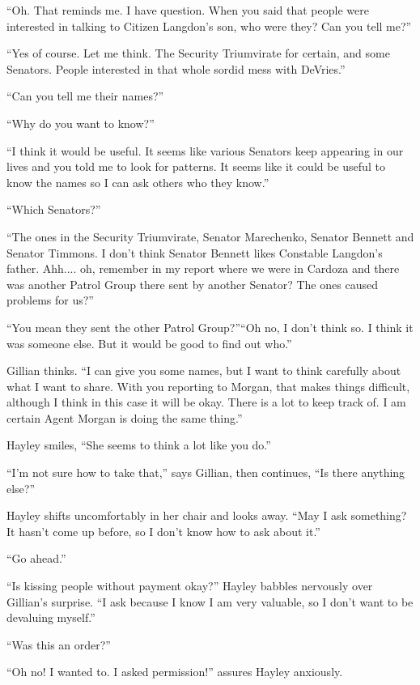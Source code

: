 ``Oh.  That reminds me.  I have question.  When you said that people were interested in talking to Citizen Langdon's son, who were they?  Can you tell me?''

``Yes of course.  Let me think.  The Security Triumvirate for certain, and some Senators.  People interested in that whole sordid mess with DeVries.''

``Can you tell me their names?''

``Why do you want to know?''

``I think it would be useful.  It seems like various Senators keep appearing in our lives and you told me to look for patterns.  It seems like it could be useful to know the names so I can ask others who they know.''

``Which Senators?''

``The ones in the Security Triumvirate, Senator Marechenko, Senator Bennett and Senator Timmons.  I don't think Senator Bennett likes Constable Langdon's father.  Ahh.... oh, remember in my report where we were in Cardoza and there was another Patrol Group there sent by another Senator?  The ones caused problems for us?''

``You mean they sent the other Patrol Group?''``Oh no, I don't think so.  I think it was someone else.  But it would be good to find out who.''

Gillian thinks.  ``I can give you some names, but I want to think carefully about what I want to share.  With you reporting to Morgan, that makes things difficult, although I think in this case it will be okay.  There is a lot to keep track of.  I am certain Agent Morgan is doing the same thing.''

Hayley smiles, ``She seems to think a lot like you do.''

``I'm not sure how to take that,'' says Gillian, then continues, ``Is there anything else?''

Hayley shifts uncomfortably in her chair and looks away. ``May I ask something?  It hasn't come up before, so I don't know how to ask about it.''

``Go ahead.''

``Is kissing people without payment okay?''  Hayley babbles nervously over Gillian's surprise. ``I ask because I know I am very valuable, so I don't want to be devaluing myself.''

``Was this an order?'' 

``Oh no!  I wanted to.  I asked permission!'' assures Hayley anxiously.

